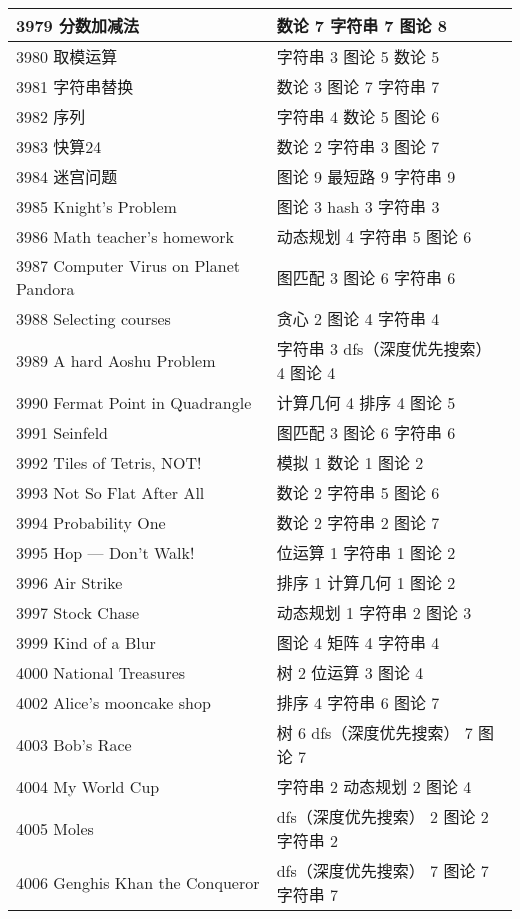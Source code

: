 \begin{longtable}{| p{} | p{} |}
 3979 分数加减法  & 数论 7 字符串 7 图论 8 \\ \hline
 3980 取模运算  & 字符串 3 图论 5 数论 5 \\ \hline
 3981 字符串替换  & 数论 3 图论 7 字符串 7 \\ \hline
 3982 序列  & 字符串 4 数论 5 图论 6 \\ \hline
 3983 快算24  & 数论 2 字符串 3 图论 7 \\ \hline
 3984 迷宫问题  & 图论 9 最短路 9 字符串 9 \\ \hline
 3985 Knight's Problem  & 图论 3 hash 3 字符串 3 \\ \hline
 3986 Math teacher's homework  & 动态规划 4 字符串 5 图论 6 \\ \hline
 3987 Computer Virus on Planet Pandora  & 图匹配 3 图论 6 字符串 6 \\ \hline
 3988 Selecting courses  & 贪心 2 图论 4 字符串 4 \\ \hline
 3989 A hard Aoshu Problem  & 字符串 3 dfs（深度优先搜索） 4 图论 4 \\ \hline
 3990 Fermat Point in Quadrangle  & 计算几何 4 排序 4 图论 5 \\ \hline
 3991 Seinfeld  & 图匹配 3 图论 6 字符串 6 \\ \hline
 3992 Tiles of Tetris, NOT!  & 模拟 1 数论 1 图论 2 \\ \hline
 3993 Not So Flat After All  & 数论 2 字符串 5 图论 6 \\ \hline
 3994 Probability One  & 数论 2 字符串 2 图论 7 \\ \hline
 3995 Hop — Don’t Walk!  & 位运算 1 字符串 1 图论 2 \\ \hline
 3996 Air Strike  & 排序 1 计算几何 1 图论 2 \\ \hline
 3997 Stock Chase  & 动态规划 1 字符串 2 图论 3 \\ \hline
 3999 Kind of a Blur  & 图论 4 矩阵 4 字符串 4 \\ \hline
 4000 National Treasures  & 树 2 位运算 3 图论 4 \\ \hline
 4002 Alice's mooncake shop  & 排序 4 字符串 6 图论 7 \\ \hline
 4003 Bob’s Race  & 树 6 dfs（深度优先搜索） 7 图论 7 \\ \hline
 4004 My World Cup  & 字符串 2 动态规划 2 图论 4 \\ \hline
 4005 Moles  & dfs（深度优先搜索） 2 图论 2 字符串 2 \\ \hline
 4006 Genghis Khan the Conqueror  & dfs（深度优先搜索） 7 图论 7 字符串 7 \\ \hline

\end{longtable}
